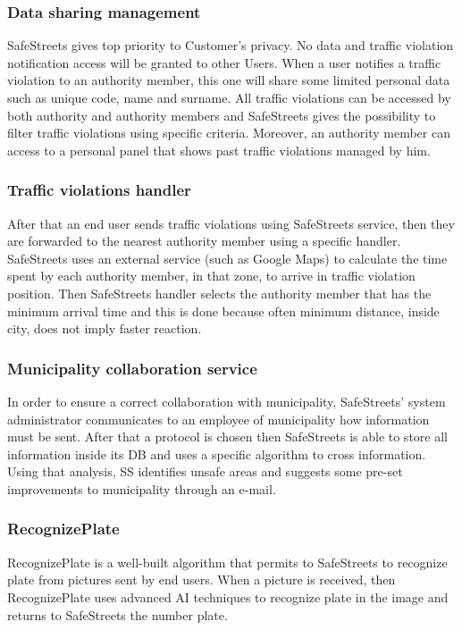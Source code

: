 \documentclass[12pt]{article}
\begin{document}
\subsubsection{Data sharing management}
\vspace{2mm}
SafeStreets gives top priority to Customer’s privacy. No data and traffic violation notification access will be granted to other Users. When a user notifies a traffic violation to an authority member, this one will share some limited personal data such as unique code, name and surname. All traffic violations can be accessed by both authority and authority members and SafeStreets gives the possibility to filter traffic violations using specific criteria. Moreover, an authority member can access to a personal panel that shows past traffic violations managed by him. 

\subsubsection{Traffic violations handler}
\vspace{2mm}
After that an end user sends traffic violations using SafeStreets service, then they are forwarded to the nearest authority member using a specific handler. SafeStreets uses an external service (such as Google Maps) to calculate the time spent by each authority member, in that zone, to arrive in traffic violation position. Then SafeStreets handler selects the authority member that has the minimum arrival time and this is done because often minimum distance, inside city, does not imply faster reaction.

\subsubsection{Municipality collaboration service }
\vspace{2mm}
In order to ensure a correct collaboration with municipality, SafeStreets’ system administrator communicates to an employee of municipality how information must be sent. After that a protocol is chosen then SafeStreets is able to store all information inside its DB and uses a specific algorithm to cross information. Using that analysis, SS identifies unsafe areas and suggests some pre-set improvements to municipality through an e-mail. 
\subsubsection{RecognizePlate}
\vspace{2mm}
RecognizePlate is a well-built algorithm that permits to SafeStreets to recognize plate from pictures sent by end users. When a picture is received, then RecognizePlate uses advanced AI techniques to recognize plate in the image and returns to SafeStreets the number plate.  
\end{document}
